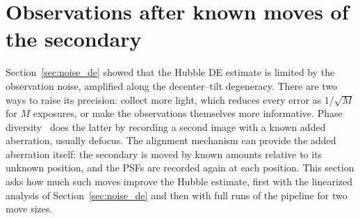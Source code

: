 %

\section{Observations after known moves of the secondary}\label{sec:noise_moves}

Section~\ref{sec:noise_de} showed that the Hubble DE estimate is limited by the observation noise, amplified along the decenter--tilt degeneracy. There are two ways to raise its precision: collect more light, which reduces every error as $1/\sqrt{M}$ for $M$ exposures, or make the observations themselves more informative. Phase diversity~\citep{Gonsalves1982} does the latter by recording a second image with a known added aberration, usually defocus. The alignment mechanism can provide the added aberration itself: the secondary is moved by known amounts relative to its unknown position, and the PSFs are recorded again at each position. This section asks how much such moves improve the Hubble estimate, first with the linearized analysis of Section~\ref{sec:noise_de} and then with full runs of the pipeline for two move sizes.


